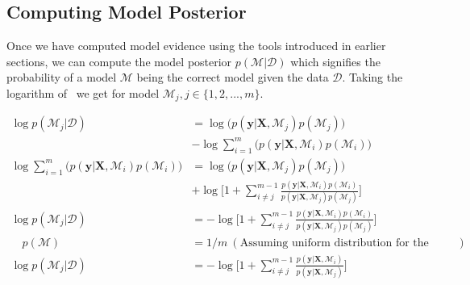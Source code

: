\subsection{Computing Model Posterior}
Once we have computed model evidence using the tools introduced in earlier sections, we can compute the model posterior $p(\mathcal{M}\vert \mathcal{D})$ which signifies the probability of a model $\mathcal{M}$ being the correct model given the data $\mathcal{D}$. Taking the logarithm of~ we get for model $\mathcal{M}_j,j\in \{1,2,...,m\}$. 
\newline

\begin{align*}
    \log p(\mathcal{M}_j\vert \mathcal{D}) & = \log \Big(p(\textbf{y}\vert\textbf{
    X},\mathcal{M}_j)p(\mathcal{M}_j) \Big) \\
    & -  \log \sum_{i=1}^{m}\Big(p(\textbf{y}\vert\textbf{
    X},\mathcal{M}_i)p(\mathcal{M}_i) \Big) \\
    \log \sum_{i=1}^{m}\Big(p(\textbf{y}\vert\textbf{
    X},\mathcal{M}_i)p(\mathcal{M}_i) \Big) & = \log \Big( p(\textbf{y}\vert\textbf{
    X},\mathcal{M}_j)p(\mathcal{M}_j) \Big) \\ & + \log \Big[ 1+ \sum_{i\neq j}^{m-1}\frac{p(\textbf{y}\vert\textbf{
    X},\mathcal{M}_i)p(\mathcal{M}_i)}{p(\textbf{y}\vert\textbf{
    X},\mathcal{M}_j)p(\mathcal{M}_j)} \Big] \\
    \log p(\mathcal{M}_j\vert \mathcal{D}) & = -\log \Big[ 1+ \sum_{i\neq j}^{m-1}\frac{p(\textbf{y}\vert\textbf{
    X},\mathcal{M}_i)p(\mathcal{M}_i)}{p(\textbf{y}\vert\textbf{
    X},\mathcal{M}_j)p(\mathcal{M}_j)} \Big] \\
    \quad p(\mathcal{M}) &= 1/m ~(\text{Assuming uniform distribution for the models}) \\
    \log p(\mathcal{M}_j\vert \mathcal{D}) & = -\log \Big[ 1+ \sum_{i\neq j}^{m-1}\frac{p(\textbf{y}\vert\textbf{
    X},\mathcal{M}_i)}{p(\textbf{y}\vert\textbf{
    X},\mathcal{M}_j)} \Big] \\
\end{align*}

